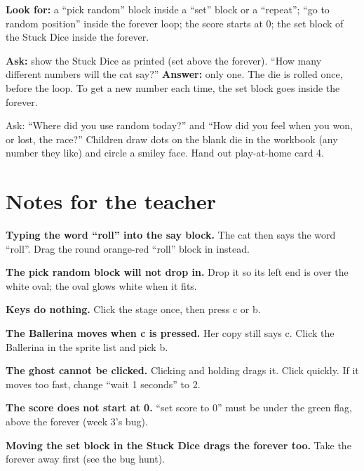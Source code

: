 \begin{formativecheck}
\textbf{Look for:} a \enquote{pick random} block inside a \enquote{set} block or a \enquote{repeat}; \enquote{go to random position} inside the forever loop; the score starts at 0; the set block of the Stuck Dice inside the forever.

\textbf{Ask:} show the Stuck Dice as printed (set above the forever). \enquote{How many different numbers will the cat say?}
\textbf{Answer:} only one. The die is rolled once, before the loop. To get a new number each time, the set block goes inside the forever.
\end{formativecheck}

\begin{reflection}
Ask: \enquote{Where did you use random today?} and \enquote{How did you feel when you won, or lost, the race?} Children draw dots on the blank die in the workbook (any number they like) and circle a smiley face. Hand out play-at-home card 4.
\end{reflection}

\section{Notes for the teacher}
\begin{commonmistakes}
  \item \textbf{Typing the word \enquote{roll} into the say block.} The cat then says the word \enquote{roll}. Drag the round orange-red \enquote{roll} block in instead.
  \item \textbf{The pick random block will not drop in.} Drop it so its left end is over the white oval; the oval glows white when it fits.
  \item \textbf{Keys do nothing.} Click the stage once, then press c or b.
  \item \textbf{The Ballerina moves when c is pressed.} Her copy still says c. Click the Ballerina in the sprite list and pick b.
  \item \textbf{The ghost cannot be clicked.} Clicking and holding drags it. Click quickly. If it moves too fast, change \enquote{wait 1 seconds} to 2.
  \item \textbf{The score does not start at 0.} \enquote{set score to 0} must be under the green flag, above the forever (week 3's bug).
  \item \textbf{Moving the set block in the Stuck Dice drags the forever too.} Take the forever away first (see the bug hunt).
\end{commonmistakes}

